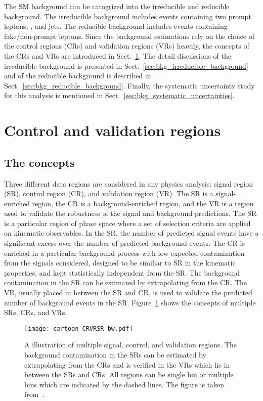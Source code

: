 The SM background can be catogrized into the irreducible and reducible background.
The irreducible background includes events containing two prompt leptons, \met, and jets.
The reducible background includes events containing fake/non-prompt leptons.
Since the background estimations rely on the choice of the control regions (CRs) and validation regions (VRs) heavily, the concepts of the CRs and VRs are introduced in Sect.~\ref{sec:bkg_control_and_validation_regions}.
The detail discussions of the irreducible background is presented in Sect.~\ref{sec:bkg_irreducible_background} and of the reducible background is described in Sect.~\ref{sec:bkg_reducible_background}.
Finally, the systematic uncertainty study for this analysis is mentioned in Sect.~\ref{sec:bkg_systematic_uncertainties}.


\section{Control and validation regions}
\label{sec:bkg_control_and_validation_regions}


\subsection{The concepts}
\label{subsec:bkg_SRs_CRs_VRs_concepts}
Three different data regions are considered in any physics analysis: signal region (SR), control region (CR), and validation region (VR).
The SR is a signal-enriched region, the CR is a background-enriched region, and the VR is a region used to validate the robustness of the signal and background predictions.
The SR is a particular region of phase space where a set of selection criteria are applied on kinematic observables.
In the SR, the number of predicted signal events have a significant excess over the number of predicted background events.
The CR is enriched in a particular background process with low expected contamination from the signals considered, designed to be similiar to SR in the kinematic properties, and kept statistically independent from the SR.
The background contamination in the SR can be estimated by extrapolating from the CR.
The VR, usually placed in between the SR and CR, is used to validate the predicted number of background events in the SR.
Figure~\ref{fig:bkg_SRs_CRs_VRs} shows the concepts of multiple SRs, CRs, and VRs.

\begin{figure}[htbp]
    \begin{center}
        \texttt{[image: cartoon\_CRVRSR\_bw.pdf]}
        \caption{A illustration of multiple signal, control, and validation regions.
        The background contamination in the SRs can be estimated by extrapolating from the CRs and is verified in the VRs which lie in between the SRs and CRs.
        All regions can be single bin or multiple bins which are indicated by the dashed lines.
        The figure is taken from~\cite{Baak:2014wma}.}
        \label{fig:bkg_SRs_CRs_VRs}
    \end{center}
\end{figure}

